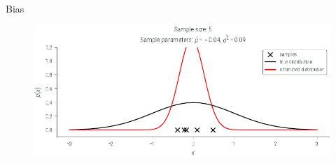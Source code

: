 \documentclass[handout]{beamer}
\begin{document}
             \begin{frame}{Bias }
            \begin{figure}
                \includegraphics{../figures/mle/biased-mle-normal-5-5.pdf}
            \end{figure}
            
        \end{frame}


    

    


    
\end{document}
